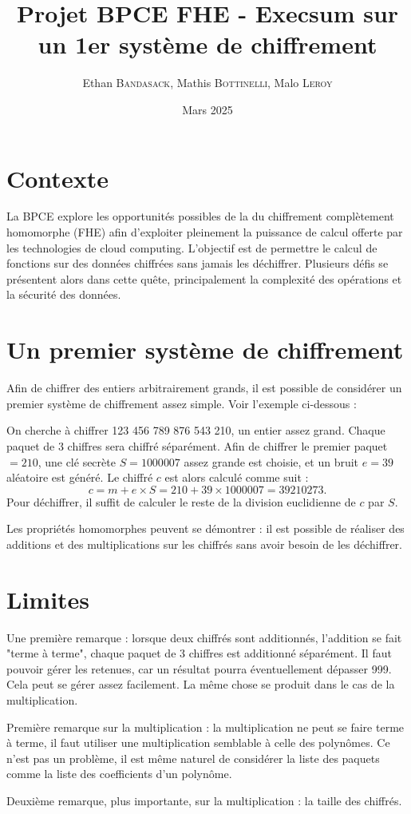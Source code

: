 \documentclass{article}
\title{Projet BPCE FHE - Execsum sur un 1er système de chiffrement}
\author{
    Ethan \textsc{Bandasack},
    Mathis \textsc{Bottinelli},
    Malo \textsc{Leroy}
    }
\date{Mars 2025}
\begin{document}
\maketitle

\setlength{\parindent}{0cm}
\setlength{\parskip}{0.2cm}

\section{Contexte}

La BPCE explore les opportunités possibles de la du chiffrement complètement homomorphe (FHE) afin d'exploiter pleinement la puissance de calcul offerte par les technologies de cloud computing. L'objectif est de permettre le calcul de fonctions sur des données chiffrées sans jamais les déchiffrer. Plusieurs défis se présentent alors dans cette quête, principalement la complexité des opérations et la sécurité des données.


\section{Un premier système de chiffrement}

Afin de chiffrer des entiers arbitrairement grands, il est possible de considérer un premier système de chiffrement assez simple. Voir l'exemple ci-dessous :

On cherche à chiffrer 123 456 789 876 543 210, un entier assez grand. Chaque paquet de 3 chiffres sera chiffré séparément. Afin de chiffrer le premier paquet $=210$, une clé secrète $S=1 000 007$ assez grande est choisie, et un bruit $e=39$ aléatoire est généré. Le chiffré $c$ est alors calculé comme suit :
$$c = m + e\times S = 210 + 39 \times 1 000 007 = 39 210 273.$$
Pour déchiffrer, il suffit de calculer le reste de la division euclidienne de $c$ par $S$.

Les propriétés homomorphes peuvent se démontrer : il est possible de réaliser des additions et des multiplications sur les chiffrés sans avoir besoin de les déchiffrer.

\section{Limites}

Une première remarque : lorsque deux chiffrés sont additionnés, l'addition se fait "terme à terme", chaque paquet de 3 chiffres est additionné séparément. Il faut pouvoir gérer les retenues, car un résultat pourra éventuellement dépasser 999. Cela peut se gérer assez facilement. La même chose se produit dans le cas de la multiplication.

Première remarque sur la multiplication : la multiplication ne peut se faire terme à terme, il faut utiliser une multiplication semblable à celle des polynômes. Ce n'est pas un problème, il est même naturel de considérer la liste des paquets comme la liste des coefficients d'un polynôme.

Deuxième remarque, plus importante, sur la multiplication : la taille des chiffrés.
\end{document}
